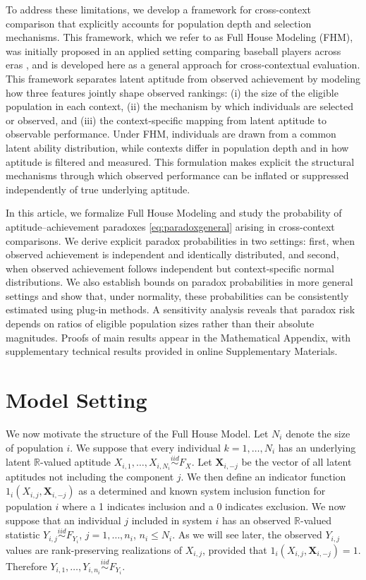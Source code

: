 \documentclass[12pt]{article}
\newcommand{\R}{\mathbb{R}}
\begin{document}
To address these limitations, we develop a framework for cross-context comparison that explicitly accounts for population depth and selection mechanisms. This framework, which we refer to as Full House Modeling (FHM), was initially proposed in an applied setting comparing baseball players across eras \citep{yan2025comparing}, and is developed here as a general approach for cross-contextual evaluation. This framework separates latent aptitude from observed achievement by modeling how three features jointly shape observed rankings: (i) the size of the eligible population in each context, (ii) the mechanism by which individuals are selected or observed, and (iii) the context-specific mapping from latent aptitude to observable performance. Under FHM, individuals are drawn from a common latent ability distribution, while contexts differ in population depth and in how aptitude is filtered and measured. This formulation makes explicit the structural mechanisms through which observed performance can be inflated or suppressed independently of true underlying aptitude.

In this article, we formalize Full House Modeling and study the probability of aptitude--achievement paradoxes \eqref{eq:paradoxgeneral} arising in cross-context comparisons. We derive explicit paradox probabilities in two settings: first, when observed achievement is independent and identically distributed, and second, when observed achievement follows independent but context-specific normal distributions. We also establish bounds on paradox probabilities in more general settings and show that, under normality, these probabilities can be consistently estimated using plug-in methods. A sensitivity analysis reveals that paradox risk depends on ratios of eligible population sizes rather than their absolute magnitudes. Proofs of main results appear in the Mathematical Appendix, with supplementary technical results provided in online Supplementary Materials.




\section{Model Setting}
\label{sec:modelsetting}

We now motivate the structure of the Full House Model. Let $N_i$ denote the size of population $i$. We suppose that every individual $k = 1,\ldots, N_i$ has an underlying latent $\R$-valued aptitude 
$X_{i,1}, \ldots, X_{i,N_i} \overset{iid}{\sim} F_{X}$. Let $\textbf{X}_{i,-j}$ be the vector of all latent aptitudes not including the component $j$. We then define an indicator function $1_{i}\left(X_{i,j},\textbf{X}_{i,-j}\right)$ as a determined and known system inclusion function for population $i$ where a 1 indicates inclusion and a 0 indicates exclusion. We now suppose that an individual $j$ included in system $i$ has an observed $\R$-valued statistic $Y_{i,j} \overset{iid}{\sim} F_{Y_i}$, $j = 1,\ldots,n_i$, $n_i \leq N_i$. As we will see later, the observed $Y_{i,j}$ values are rank-preserving realizations of $X_{i,j}$, provided that $1_{i}\left(X_{i,j}, \textbf{X}_{i,-j}\right)=1$. Therefore $Y_{i,1}, \ldots, Y_{i,n_i} \overset{iid}{\sim} F_{Y_i}$. 
\end{document}
